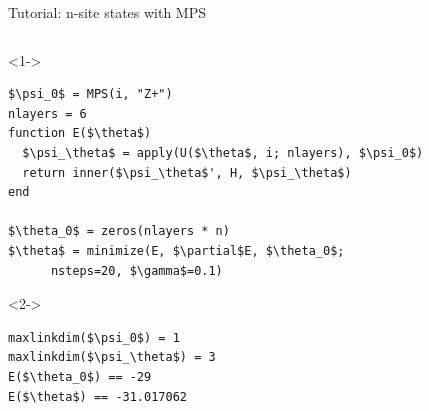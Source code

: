 \begin{frame}[fragile]{Tutorial: n-site states with MPS}

\begin{columns}

\begin{column}{5.5cm}

\begin{onlyenv}<1->
\begin{lstlisting}[language=JuliaLocal, style=julia, mathescape, basicstyle=\scriptsize\ttfamily]
$\psi_0$ = MPS(i, "Z+")
nlayers = 6
function E($\theta$)
  $\psi_\theta$ = apply(U($\theta$, i; nlayers), $\psi_0$)
  return inner($\psi_\theta$', H, $\psi_\theta$)
end

$\theta_0$ = zeros(nlayers * n)
$\theta$ = minimize(E, $\partial$E, $\theta_0$;
      nsteps=20, $\gamma$=0.1)
\end{lstlisting}
\end{onlyenv}

\begin{onlyenv}<2->
\begin{lstlisting}[language=JuliaLocal, style=julia, mathescape, basicstyle=\scriptsize\ttfamily]
maxlinkdim($\psi_0$) = 1
maxlinkdim($\psi_\theta$) = 3
E($\theta_0$) == -29
E($\theta$) == -31.017062
\end{lstlisting}
\end{onlyenv}

\end{column}

\begin{column}{4.5cm}



\end{column}
\end{columns}
\end{frame}
